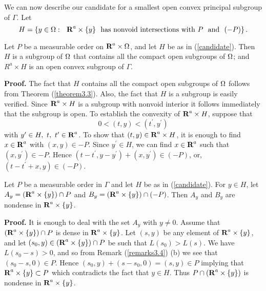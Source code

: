 %
%
%
We can now describe our candidate 
for a smallest open convex 
principal  subgroup of $\Gamma$.
Let
%
%
%
\begin{equation}
H=\left\{
y\in\O:\ \ \R^a\times\{y\} \ 
{\rm \ has\ nonvoid\ intersections\ with}\  P\  
{\rm \ and\ } \ (-P)
\right\}.
\label{candidate}
\end{equation}
%
%
%
%
%
%
\begin{proposition31}
Let $P$ be a measurable order 
on $\R^a\times \O$, and let $H$ be as in (\ref{candidate}).  
%
Then $H$ is a subgroup of $\Omega$ that contains all the compact
open subgroups of $\Omega$;
and $R^a\times H$ is an open convex 
subgroup of $\Gamma$.
\label{proposition31}
\end{proposition31}
%
%
%
{\bf Proof.}  The fact that $H$ contains all the 
compact open subgroups of 
$\Omega$ follows from Theorem (\ref{theorem3.3}).
Also, the fact that $H$ is a subgroup is easily verified.
Since $\R^a\times H$ is a subgroup with nonvoid interior
it follows immediately that the subgroup is open.
%
%
%
To establish the convexity of $\R^a\times H$,
suppose that 
%
%
%
$$0< (t,y) < (t^\prime, y^\prime)$$
% 
%
%
with $y^\prime\in H,\ t,\ t^\prime \in \R^a$. 
To show that 
 $(t,y)\in \R^a\times H$, it is enough to 
 find $x\in \R^a$ with $(x,y)\in -P$.
 Since $y^\prime \in H$, we can find
 $x\in \R^a$ such that $(x,y^\prime)\in -P$.
 Hence 
 $(t-t^\prime ,y-y^\prime) +(x,y^\prime)\in (-P)$, 
 or,
 $(t-t^\prime +x , y)\in (-P)$. \\
%
%
%
\begin{lemma31}
Let $P$ be a measurable order in $\Gamma$ 
and let $H$ be as in (\ref{candidate}).  
%
For $y\in H$, let $A_y=(\R^a\times\{y\})\cap P$ and 
$B_y=(\R^a\times\{y\})\cap (-P)$.  
%
Then $A_y$ and $B_y$ are nondense in $\R^a\times\{y\}$. 
\label{lemma31}
\end{lemma31}
%
%
%
{\bf Proof.}  
It is enough to deal with the set $A_y$
with $y\neq 0$.  
%
Assume that 
$(\R^a\times\{y\})\cap P$ is dense 
in $\R^a\times\{y\}$.  
%
Let $(s,y)$ be any element of $\R^a\times\{y\}$, and let 
$(s_0,y)\in (\R^a\times\{y\}) \cap P$ 
be such that $L(s_0)> L(s)$.  
%
We have $L(s_0-s)>0$, and so from Remark (\ref{remarks3.4}) (b)
we see that $(s_0-s,0)\in P$.  
%
Hence $(s_0,y)+(s-s_0,0)=(s,y)\in P$ 
implying that $\R^a\times\{y\}\subset P$ 
which contradicts the fact that $y\in H$.  
%
Thus $P\cap(\R^a\times\{y\})$ is 
nondense in $\R^a\times\{y\}$.\\
%
%
%
%

